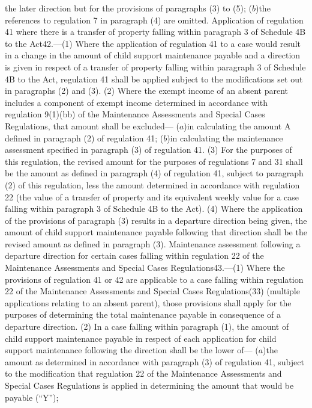 \documentclass[a4paper]{article}
\begin{document}
the later direction but for the provisions of paragraphs (3) to (5);
($b$)the references to regulation 7 in paragraph (4) are omitted.
Application of regulation 41 where there is a transfer of property falling
within paragraph 3 of Schedule 4B to the Act42.—(1) Where the application of
regulation 41 to a case would result in a change in the amount of child support
maintenance payable and a direction is given in respect of a transfer of
property falling within paragraph 3 of Schedule 4B to the Act, regulation 41
shall be applied subject to the modifications set out in paragraphs (2) and (3).
(2) Where the exempt income of an absent parent includes a component of exempt
income determined in accordance with regulation 9(1)(bb) of the Maintenance
Assessments and Special Cases Regulations, that amount shall be excluded—
($a$)in calculating the amount A defined in paragraph (2) of regulation 41;
($b$)in calculating the maintenance assessment specified in paragraph (3) of
regulation 41.
(3) For the purposes of this regulation, the revised amount for the purposes of
regulations 7 and 31 shall be the amount as defined in paragraph (4) of
regulation 41, subject to paragraph (2) of this regulation, less the amount
determined in accordance with regulation 22 (the value of a transfer of property
and its equivalent weekly value for a case falling within paragraph 3 of
Schedule 4B to the Act).
(4) Where the application of the provisions of paragraph (3) results in a
departure direction being given, the amount of child support maintenance payable
following that direction shall be the revised amount as defined in paragraph
(3).
Maintenance assessment following a departure direction for certain cases falling
within regulation 22 of the Maintenance Assessments and Special Cases
Regulations43.—(1) Where the provisions of regulation 41 or 42 are applicable to
a case falling within regulation 22 of the Maintenance Assessments and Special
Cases Regulations(33) (multiple applications relating to an absent parent),
those provisions shall apply for the purposes of determining the total
maintenance payable in consequence of a departure direction.
(2) In a case falling within paragraph (1), the amount of child support
maintenance payable in respect of each application for child support maintenance
following the direction shall be the lower of—
($a$)the amount as determined in accordance with paragraph (3) of regulation 41,
subject to the modification that regulation 22 of the Maintenance Assessments
and Special Cases Regulations is applied in determining the amount that would be
payable (“Y”);
\end{document}

